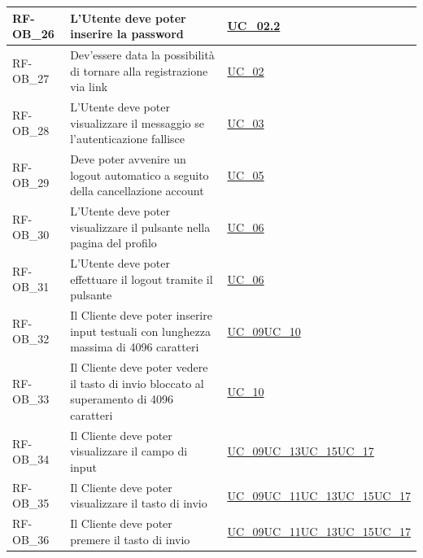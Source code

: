 \begin{longtable}{|>{\raggedright}p{}|>{\raggedright\arraybackslash}p{}|>{\raggedright\arraybackslash}p{}|}
	\hline
	RF-OB\_26 \hypertarget{rf-ob_26} & L'Utente deve poter inserire la password & \hyperref[uc_02.2]{UC\_02.2} \\
	\hline
	RF-OB\_27 \hypertarget{rf-ob_27} & Dev'essere data la possibilità di tornare alla registrazione via link & \hyperref[uc_02]{UC\_02} \\
	\hline
	RF-OB\_28 \hypertarget{rf-ob_28} & L'Utente deve poter visualizzare il messaggio \vr{Username o password errati} se l'autenticazione fallisce & \hyperref[uc_03]{UC\_03} \\
	\hline
	RF-OB\_29 \hypertarget{rf-ob_29} & Deve poter avvenire un logout automatico a seguito della cancellazione account & \hyperref[uc_05]{UC\_05}\\
	\hline
	RF-OB\_30 \hypertarget{rf-ob_30} & L'Utente deve poter visualizzare il pulsante \vr{Logout} nella pagina del profilo & \hyperref[uc_06]{UC\_06}\\
	\hline
	RF-OB\_31 \hypertarget{rf-ob_31} & L'Utente deve poter effettuare il logout tramite il pulsante \vr{Logout} & \hyperref[uc_06]{UC\_06} \\
	\hline
	RF-OB\_32 \hypertarget{rf-ob_32} & Il Cliente deve poter inserire input testuali con lunghezza massima di 4096 caratteri & \hyperref[uc_09]{UC\_09}\newline \hyperref[uc_10]{UC\_10} \\
	\hline
	RF-OB\_33 \hypertarget{rf-ob_33} & Il Cliente deve poter vedere il tasto di invio bloccato al superamento di 4096 caratteri & \hyperref[uc_10]{UC\_10} \\
	\hline
	RF-OB\_34 \hypertarget{rf-ob_34} & Il Cliente deve poter visualizzare il campo di input & \hyperref[uc_09]{UC\_09}\newline \hyperref[uc_13]{UC\_13}\newline \hyperref[uc_15]{UC\_15}\newline \hyperref[uc_17]{UC\_17} \\
	\hline
	RF-OB\_35 \hypertarget{rf-ob_35} & Il Cliente deve poter visualizzare il tasto di invio & \hyperref[uc_09]{UC\_09}\newline \hyperref[uc_11]{UC\_11}\newline \hyperref[uc_13]{UC\_13}\newline \hyperref[uc_15]{UC\_15}\newline \hyperref[uc_17]{UC\_17} \\
	\hline
	RF-OB\_36 \hypertarget{rf-ob_36} & Il Cliente deve poter premere il tasto di invio & \hyperref[uc_09]{UC\_09}\newline \hyperref[uc_11]{UC\_11}\newline \hyperref[uc_13]{UC\_13}\newline \hyperref[uc_15]{UC\_15}\newline \hyperref[uc_17]{UC\_17} \\

\end{longtable}
